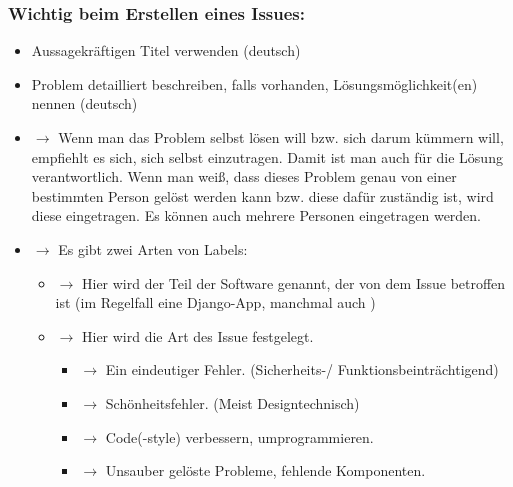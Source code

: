 \documentclass[letterpaper,10pt,ngerman]{sphinxmanual}
\begin{document}
\subsubsection{Wichtig beim Erstellen eines Issues:}
\label{\detokenize{dev/git:wichtig-beim-erstellen-eines-issues}}\begin{itemize}
\item {} 
Aussagekräftigen Titel verwenden (deutsch)

\item {} 
Problem detailliert beschreiben, falls vorhanden, Lösungsmöglichkeit(en) nennen (deutsch)

\item {} 
 \(\rightarrow\) Wenn man das Problem selbst lösen will bzw. sich darum kümmern will, empfiehlt es sich, sich selbst einzutragen. Damit ist man auch für die Lösung verantwortlich. Wenn man weiß, dass dieses Problem genau von einer bestimmten Person gelöst werden kann bzw. diese dafür zuständig ist, wird diese eingetragen. Es können auch mehrere Personen eingetragen werden.

\item {} 
  \(\rightarrow\)  Es gibt zwei Arten von Labels:
\begin{itemize}
\item {} 
 \(\rightarrow\) Hier wird der Teil der Software genannt, der von dem Issue betroffen ist (im Regelfall eine Django-App, manchmal auch )

\item {} 
 \(\rightarrow\) Hier wird die Art des Issue festgelegt.
\begin{itemize}
\item {} 
 \(\rightarrow\) Ein eindeutiger Fehler. (Sicherheits-/ Funktionsbeinträchtigend)

\item {} 
 \(\rightarrow\) Schönheitsfehler. (Meist Designtechnisch)

\item {} 
 \(\rightarrow\) Code(-style) verbessern, umprogrammieren.

\item {} 
 \(\rightarrow\) Unsauber gelöste Probleme, fehlende Komponenten.


\end{itemize}
\end{itemize}
\end{itemize}
\end{document}
